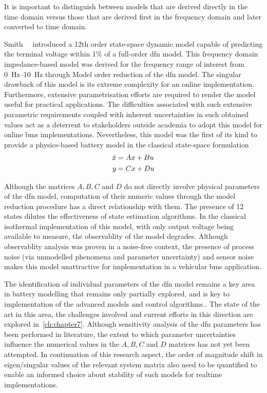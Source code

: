 It is important to distinguish between models that are derived directly in the time domain versus those that are derived
first in the frequency domain and later converted to time domain.

Smith~\etal{}~\cite{Smith2007} introduced a 12th order state-space dynamic model capable of predicting the terminal
voltage within 1\% of a full-order \gls{dfn} model. This frequency domain impedance-based model was derived for the
frequency range of interest from \SIrange{0}{10}{\hertz} through Model order reduction of the \gls{dfn} model. The
singular drawback of this model is its extreme complexity for an online implementation. Furthermore, extensive
parametrisation efforts are required  to
render the model useful for practical applications. The difficulties associated with such extensive parametric
requirements coupled with inherent uncertainties in such obtained values act as a deterrent to stakeholders outside
academia to adopt this model for online \gls{bms} implementations. Nevertheless, this model was the first of its kind to
provide a physics-based battery model in the classical state-space formulation
\begin{align}
    \dot{x} &= Ax + Bu \\\notag
    y &= Cx + Du
\end{align}

Although the matrices $A, B, C$ and $D$ do not directly involve physical parameters of the \gls{dfn} model, computation
of their numeric values through the model reduction procedure has a direct relationship with them. The presence of 12
states dilutes the effectiveness of state estimation algorithms. In the classical isothermal implementation of this
model, with only output voltage being available to measure, the observablity of the model degrades. Although
observablity analysis was proven in a noise-free context, the presence of process noise (via unmodelled phenomena and
parameter uncertainty) and sensor noise makes this model unattractive for implementation in a vehicular \gls{bms}
application.

The identification of individual parameters of the \gls{dfn} model remains a key area in battery modelling that remains
only partially explored, and is key to implementation of the advanced models and control algorithms.. The state of the art in this area, the challenges involved and current efforts in
this direction are explored in~\cref{ch:chapter7}. Although sensitivity analysis of the \gls{dfn} parameters has been
performed in literature,  the extent to which parameter uncertainties influence the numerical values
in the $A, B, C$ and $D$ matrices has not yet been attempted. In continuation of this research aspect, the order of
magnitude shift in eigen/singular values of the relevant system matrix also need to be quantified to enable an informed
choice about stability of such models for realtime implementations.

